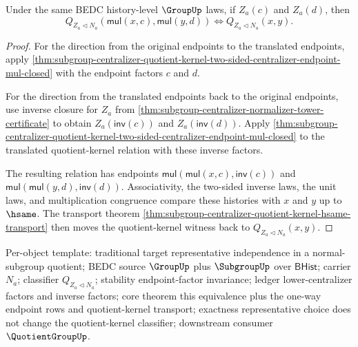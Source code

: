 \begin{theorem}
\label{thm:subgroup-centralizer-quotient-kernel-centralizer-endpoint-invariance}
Under the same BEDC history-level $\GroupUp$ laws, if $Z_a(c)$ and $Z_a(d)$,
then
$$
Q_{Z_a\triangleleft N_a}(\mathsf{mul}(x,c),\mathsf{mul}(y,d))
\Longleftrightarrow Q_{Z_a\triangleleft N_a}(x,y).
$$
\end{theorem}
\begin{proof}
For the direction from the original endpoints to the translated endpoints,
apply
\autoref{thm:subgroup-centralizer-quotient-kernel-two-sided-centralizer-endpoint-mul-closed}
with the endpoint factors $c$ and $d$.

For the direction from the translated endpoints back to the original
endpoints, use inverse closure for $Z_a$ from
\autoref{thm:subgroup-centralizer-normalizer-tower-certificate} to obtain
$Z_a(\mathsf{inv}(c))$ and $Z_a(\mathsf{inv}(d))$. Apply
\autoref{thm:subgroup-centralizer-quotient-kernel-two-sided-centralizer-endpoint-mul-closed}
to the translated quotient-kernel relation with these inverse factors.

The resulting relation has endpoints
$\mathsf{mul}(\mathsf{mul}(x,c),\mathsf{inv}(c))$ and
$\mathsf{mul}(\mathsf{mul}(y,d),\mathsf{inv}(d))$. Associativity, the
two-sided inverse laws, the unit laws, and multiplication congruence compare
these histories with $x$ and $y$ up to $\hsame$. The transport theorem
\autoref{thm:subgroup-centralizer-quotient-kernel-hsame-transport} then moves
the quotient-kernel witness back to $Q_{Z_a\triangleleft N_a}(x,y)$.
\end{proof}

Per-object template: traditional target representative independence in a
normal-subgroup quotient; BEDC source $\GroupUp$ plus $\SubgroupUp$ over
$\mathsf{BHist}$; carrier $N_a$; classifier $Q_{Z_a\triangleleft N_a}$;
stability endpoint-factor invariance; ledger lower-centralizer factors and
inverse factors; core theorem this equivalence plus the one-way endpoint rows
and quotient-kernel transport; exactness representative choice does not change
the quotient-kernel classifier; downstream consumer $\QuotientGroupUp$.

